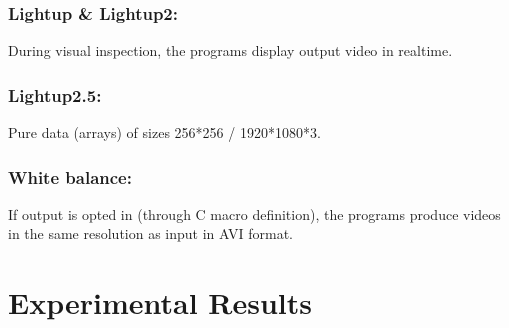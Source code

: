 \documentclass{acm_proc_article-sp}
\begin{document}
\subsubsection{Lightup \& Lightup2:}
During visual inspection, the programs display output video in realtime.
\subsubsection{Lightup2.5:}
Pure data (arrays) of sizes 256*256 / 1920*1080*3.
\subsubsection{White balance:}
If output is opted in (through C macro definition), the programs produce videos in the same resolution as input in AVI format. 

\section{Experimental Results}
\end{document}
